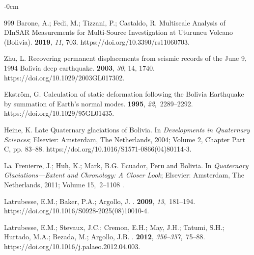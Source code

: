 \documentclass[data,article,accept,pdftex,moreauthors]{Definitions/mdpi}
\begin{document}
{\begin{adjustwidth}{-\extralength}{0cm}
\begin{thebibliography}{999}
Barone, A.; Fedi, M.; Tizzani, P.; Castaldo, R.
\newblock Multiscale Analysis of DInSAR Measurements for Multi-Source
 Investigation at Uturuncu Volcano (Bolivia).
 {\bf 2019}, {\em 11}, 703.
https://doi.org/10.3390/rs11060703.

Zhu, L.
\newblock Recovering permanent displacements from seismic records of the June 9, 1994 Bolivia deep earthquake.
 {\bf 2003}, {\em 30}, 14, 1740. https://doi.org/10.1029/2003GL017302.

Ekström, G.
\newblock Calculation of static deformation following the Bolivia Earthquake by
 summation of Earth's normal modes.
 {\bf 1995}, {\em 22},~2289--2292.
https://doi.org/10.1029/95GL01435.

Heine, K. {Late Quaternary glaciations of Bolivia}.
\newblock In {\em {Developments in Quaternary Sciences}}; Elsevier: Amsterdam, The Netherlands, 2004; Volume 2, Chapter {Part C}, pp. 83--88.
https://doi.org/10.1016/S1571-0866(04)80114-3.

La~Frenierre, J.; Huh, K.; Mark, B.G. Ecuador, Peru and Bolivia.
\newblock In {\em {Quaternary Glaciations---Extent and Chronology: A Closer
 Look}}; Elsevier: Amsterdam, The Netherlands, 2011; Volume 15,~2--1108 . %

Latrubesse, E.M.; Baker, P.A.; Argollo, J.
.
 {\bf 2009}, {\em
 13},~181--194.
https://doi.org/10.1016/S0928-2025(08)10010-4.

Latrubesse, E.M.; Stevaux, J.C.; Cremon, E.H.; May, J.H.; Tatumi, S.H.;
 Hurtado, M.A.; Bezada, M.; Argollo, J.B.
.
 {\bf 2012},
 {\em 356--357},~75--88.
https://doi.org/10.1016/j.palaeo.2012.04.003.


\end{thebibliography}
\end{adjustwidth}}
\end{document}
